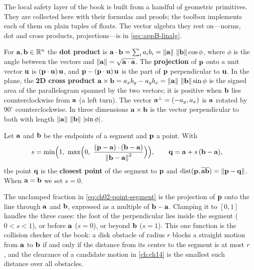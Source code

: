 The local safety layer of the book is built from a handful of geometric primitives. They are collected here with their formulas and proofs; the toolbox implements each of them on plain tuples of floats. The vector algebra they rest on---norms, dot and cross products, projections---is in \cref{sec:appB-linalg}.

\begin{definition}
\label{def:ch02-dot-cross}
For $\mathbf{a},\mathbf{b}\in\mathbb{R}^n$ the \textbf{dot product} is $\mathbf{a}\cdot\mathbf{b}=\sum_i a_ib_i=\left\lVert \mathbf{a} \right\rVert\,\left\lVert \mathbf{b} \right\rVert\cos\phi$, where $\phi$ is the angle between the vectors and $\left\lVert \mathbf{a} \right\rVert=\sqrt{\mathbf{a}\cdot\mathbf{a}}$. The \textbf{projection} of $\mathbf{p}$ onto a unit vector $\mathbf{u}$ is $(\mathbf{p}\cdot\mathbf{u})\,\mathbf{u}$, and $\mathbf{p}-(\mathbf{p}\cdot\mathbf{u})\,\mathbf{u}$ is the part of $\mathbf{p}$ perpendicular to $\mathbf{u}$. In the plane, the \textbf{2D cross product} $\mathbf{a}\times\mathbf{b}=a_xb_y-a_yb_x=\left\lVert \mathbf{a} \right\rVert\,\left\lVert \mathbf{b} \right\rVert\sin\phi$ is the signed area of the parallelogram spanned by the two vectors; it is positive when $\mathbf{b}$ lies counterclockwise from $\mathbf{a}$ (a left turn). The vector $\mathbf{a}^{\perp}=(-a_y,a_x)$ is $\mathbf{a}$ rotated by $90^\circ$ counterclockwise. In three dimensions $\mathbf{a}\times\mathbf{b}$ is the vector perpendicular to both with length $\left\lVert \mathbf{a} \right\rVert\,\left\lVert \mathbf{b} \right\rVert\,\left\lvert \sin\phi \right\rvert$.
\end{definition}

\begin{definition}
\label{def:ch02-point-segment-distance}
Let $\mathbf{a}$ and $\mathbf{b}$ be the endpoints of a segment and $\mathbf{p}$ a point. With
\begin{equation}
s=\min\Bigl(1,\ \max\Bigl(0,\ \frac{(\vect{p}-\vect{a})\cdot(\vect{b}-\vect{a})}{\norm{\vect{b}-\vect{a}}^2}\Bigr)\Bigr),
\qquad \vect{q}=\vect{a}+s\,(\vect{b}-\vect{a}),
\label{eq:ch02-point-segment}
\end{equation}
the point $\mathbf{q}$ is the \textbf{closest point} of the segment to $\mathbf{p}$ and $\operatorname{dist}(\mathbf{p},\overline{\mathbf{a}\mathbf{b}})=\left\lVert \mathbf{p}-\mathbf{q} \right\rVert$. When $\mathbf{a}=\mathbf{b}$ we set $s=0$.
\end{definition}

The unclamped fraction in \cref{eq:ch02-point-segment} is the projection of $\mathbf{p}$ onto the line through $\mathbf{a}$ and $\mathbf{b}$, expressed as a multiple of $\mathbf{b}-\mathbf{a}$. Clamping it to $[0,1]$ handles the three cases: the foot of the perpendicular lies inside the segment ($0<s<1$), or before $\mathbf{a}$ ($s=0$), or beyond $\mathbf{b}$ ($s=1$). This one function is the collision checker of the book: a disk obstacle of radius $r$ blocks a straight motion from $\mathbf{a}$ to $\mathbf{b}$ if and only if the distance from its center to the segment is at most $r$, and the clearance of a candidate motion in \cref{ch:ch14} is the smallest such distance over all obstacles.

